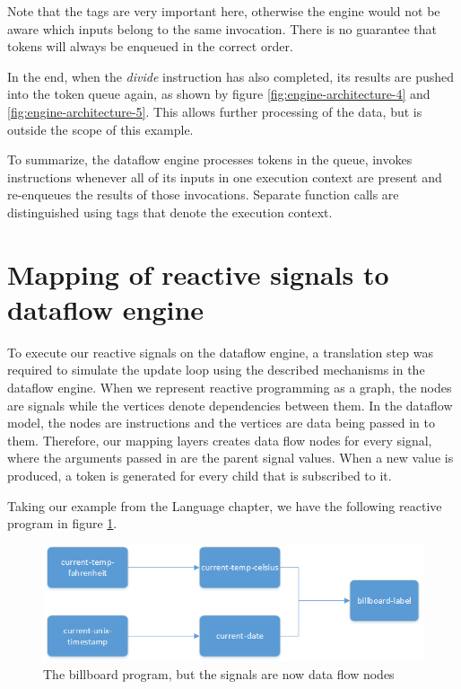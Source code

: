 Note that the tags are very important here, otherwise the engine would not be aware which inputs belong to the same invocation. There is no guarantee that tokens will always be enqueued in the correct order.

In the end, when the \textit{divide} instruction has also completed, its results are pushed into the token queue again, as shown by figure \ref{fig:engine-architecture-4} and \ref{fig:engine-architecture-5}. This allows further processing of the data, but is outside the scope of this example. 

To summarize, the dataflow engine processes tokens in the queue, invokes instructions whenever all of its inputs in one execution context are present and re-enqueues the results of those invocations. Separate function calls are distinguished using tags that denote the execution context.

\section{Mapping of reactive signals to dataflow engine}

To execute our reactive signals on the dataflow engine, a translation step was required to simulate the update loop using the described mechanisms in the dataflow engine.
When we represent reactive programming as a graph, the nodes are signals while the vertices denote dependencies between them.
In the dataflow model, the nodes are instructions and the vertices are data being passed in to them. Therefore, our mapping layers creates data flow nodes for every signal, where the arguments passed in are the parent signal values. When a new value is produced, a token is generated for every child that is subscribed to it.

Taking our example from the Language chapter, we have the following reactive program in figure \ref{fig:engine-mapping-1}.

\begin{figure}[h!]
	\includegraphics[width=\textwidth]{images/Engine-Mapping-1.png}
	\caption{The billboard program, but the signals are now data flow nodes}
	\label{fig:engine-mapping-1}
\end{figure}

